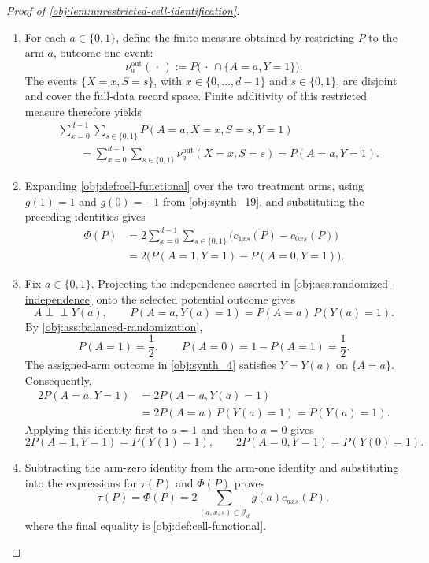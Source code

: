 \begin{proof}[Proof of \cref{obj:lem:unrestricted-cell-identification}]
\begin{enumerate}
\item For each \(a\in\{0,1\}\), define the finite measure obtained by restricting \(P\) to the arm-\(a\), outcome-one event:
\[
\nu_a^{\mathrm{out}}(\,\cdot\,)
:=P\bigl(\,\cdot\,\cap\{A=a,Y=1\}\bigr).
\]
The events \(\{X=x,S=s\}\), with \(x\in\{0,\ldots,d-1\}\) and \(s\in\{0,1\}\), are disjoint and cover the full-data record space. Finite additivity of this restricted measure therefore yields
\[
\begin{aligned}
&\sum_{x=0}^{d-1}\sum_{s\in\{0,1\}}
P(A=a,X=x,S=s,Y=1)\\
&\qquad =
\sum_{x=0}^{d-1}\sum_{s\in\{0,1\}}
\nu_a^{\mathrm{out}}(X=x,S=s)
=P(A=a,Y=1).
\end{aligned}
\] %

\item Expanding \cref{obj:def:cell-functional} over the two treatment arms, using \(g(1)=1\) and \(g(0)=-1\) from \cref{obj:synth_19}, and substituting the preceding identities gives
\[
\begin{aligned}
\Phi(P)
&=2\sum_{x=0}^{d-1}\sum_{s\in\{0,1\}}
\bigl(c_{1xs}(P)-c_{0xs}(P)\bigr)\\
&=2\bigl(P(A=1,Y=1)-P(A=0,Y=1)\bigr).
\end{aligned}
\] %

\item Fix \(a\in\{0,1\}\). Projecting the independence asserted in
\cref{obj:ass:randomized-independence} onto the selected potential outcome gives
\[
A\perp\!\!\!\perp Y(a),
\qquad
P(A=a,Y(a)=1)=P(A=a)\,P(Y(a)=1).
\]
By \cref{obj:ass:balanced-randomization},
\[
P(A=1)=\frac12,
\qquad
P(A=0)=1-P(A=1)=\frac12.
\]
The assigned-arm outcome in \cref{obj:synth_4} satisfies \(Y=Y(a)\) on \(\{A=a\}\). Consequently,
\[
\begin{aligned}
2P(A=a,Y=1)
&=2P(A=a,Y(a)=1)\\
&=2P(A=a)\,P(Y(a)=1)
=P(Y(a)=1).
\end{aligned}
\]
Applying this identity first to \(a=1\) and then to \(a=0\) gives
\[
2P(A=1,Y=1)=P(Y(1)=1),
\qquad
2P(A=0,Y=1)=P(Y(0)=1).
\] %

\item Subtracting the arm-zero identity from the arm-one identity and substituting into the expressions for \(\tau(P)\) and \(\Phi(P)\) proves
\[
\tau(P)
=\Phi(P)
=2\sum_{(a,x,s)\in\mathcal J_d}g(a)c_{axs}(P),
\]
where the final equality is \cref{obj:def:cell-functional}. %
\end{enumerate}
\end{proof}
